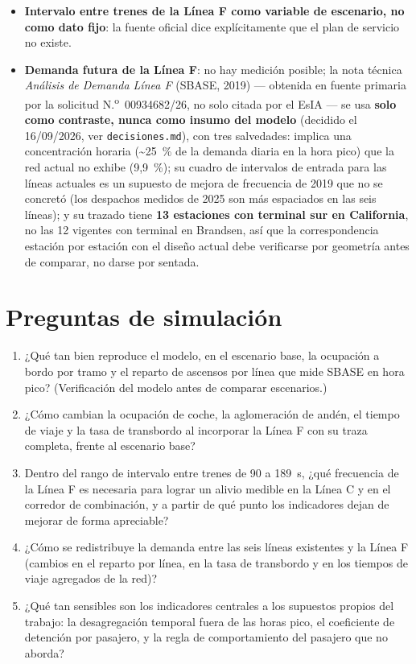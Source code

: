 \documentclass{article}
\begin{document}
\begin{itemize}
    A/C/D/H a fondo, B y E con verificación agregada.
  \item \textbf{Intervalo entre trenes de la Línea F como variable de escenario, no
    como dato fijo}: la fuente oficial dice explícitamente que el plan de servicio
    no existe.
  \item \textbf{Demanda futura de la Línea F}: no hay medición posible; la nota
    técnica \textit{Análisis de Demanda Línea F} (SBASE, 2019) --- obtenida en
    fuente primaria por la solicitud N.\textsuperscript{o}~00934682/26, no solo
    citada por el EsIA --- se usa \textbf{solo como contraste, nunca como insumo del
    modelo} (decidido el 16/09/2026, ver \texttt{decisiones.md}), con tres
    salvedades: implica una concentración horaria (\textasciitilde 25~\% de la
    demanda diaria en la hora pico) que la red actual no exhibe (9,9~\%); su cuadro
    de intervalos de entrada para las líneas actuales es un supuesto de mejora de
    frecuencia de 2019 que no se concretó (los despachos medidos de 2025 son más
    espaciados en las seis líneas); y su trazado tiene \textbf{13 estaciones con
    terminal sur en California}, no las 12 vigentes con terminal en Brandsen, así
    que la correspondencia estación por estación con el diseño actual debe
    verificarse por geometría antes de comparar, no darse por sentada.
\end{itemize}

\section{Preguntas de simulación}

\begin{enumerate}
  \item ¿Qué tan bien reproduce el modelo, en el escenario base, la ocupación a
    bordo por tramo y el reparto de ascensos por línea que mide SBASE en hora
    pico? (Verificación del modelo antes de comparar escenarios.)
  \item ¿Cómo cambian la ocupación de coche, la aglomeración de andén, el tiempo de
    viaje y la tasa de transbordo al incorporar la Línea F con su traza completa,
    frente al escenario base?
  \item Dentro del rango de intervalo entre trenes de 90 a 189~s, ¿qué frecuencia de
    la Línea F es necesaria para lograr un alivio medible en la Línea C y en el
    corredor de combinación, y a partir de qué punto los indicadores dejan de
    mejorar de forma apreciable?
  \item ¿Cómo se redistribuye la demanda entre las seis líneas existentes y la
    Línea F (cambios en el reparto por línea, en la tasa de transbordo y en los
    tiempos de viaje agregados de la red)?
  \item ¿Qué tan sensibles son los indicadores centrales a los supuestos propios del
    trabajo: la desagregación temporal fuera de las horas pico, el coeficiente de
    detención por pasajero, y la regla de comportamiento del pasajero que no
    aborda?
\end{enumerate}
\end{document}
